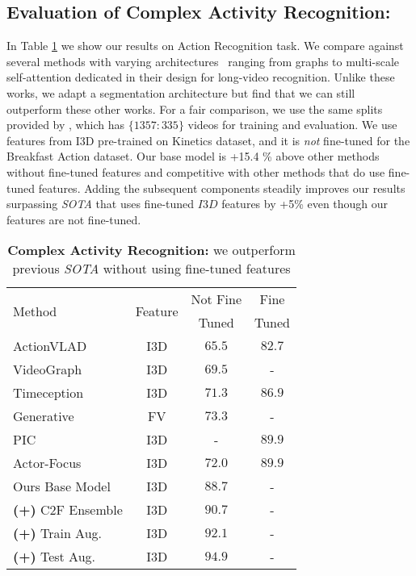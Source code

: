\documentclass[10pt,twocolumn,letterpaper]{article}
\begin{document}
\subsection{Evaluation of Complex Activity Recognition:} In Table \ref{tab:high-level-action-results} we show our results on Action Recognition task.  We compare against several methods with varying architectures~\cite{highlevel-girdhar2017actionvlad, highlevel-hussein2019videograph,highlevel-hussein2019timeception, highlevel-hussein2020pic} ranging from graphs to multi-scale self-attention dedicated in their design for long-video recognition. Unlike these works, we adapt a segmentation architecture but find that we can still outperform these other works. For a fair comparison, we use the same splits provided by \cite{highlevel-hussein2019videograph, highlevel-hussein2019timeception, highlevel-hussein2020pic}, which has $\{1357:335\}$ videos for training and evaluation. We use features from I3D pre-trained on Kinetics \cite{carreira2017quo} dataset, and it is \textit{not} fine-tuned for the Breakfast Action dataset. Our base model is +15.4 \% above other methods without fine-tuned features and competitive with other methods that do use fine-tuned features. Adding the subsequent components steadily improves our results surpassing \textit{SOTA} that uses fine-tuned $I3D$ features by +5\% even though our features are not fine-tuned.  


\begin{table}
\begin{center}
\small{
\begin{tabular}{l| c c c} 
\hline
\multirow{2}{*}{Method} & \multirow{2}{*}{Feature} & Not Fine & Fine\\
& &  Tuned & Tuned\\
\hline
\hline
ActionVLAD \cite{highlevel-girdhar2017actionvlad} & I3D & $65.5$ & $82.7$ \\
VideoGraph \cite{highlevel-hussein2019videograph} & I3D & $69.5$ & - \\
Timeception \cite{highlevel-hussein2019timeception} & I3D & $71.3$ & $86.9$ \\
Generative \cite{highlevel-kuehne2016end} & FV \cite{IDT-wang2013action} & $73.3$ & - \\
PIC \cite{highlevel-hussein2020pic} & I3D & - & $89.9$ \\
Actor-Focus \cite{highlevel-ballan2021long} & I3D & $72.0$ & $89.9$ \\
\hline
Ours Base Model & I3D & $88.7$ & -\\
\textbf{(+)} C2F Ensemble & I3D & $90.7$ & - \\
\textbf{(+)} Train Aug. & I3D & $92.1$ & - \\
\textbf{(+)} Test Aug. & I3D & $\mathbf{94.9}$ & - \\
\hline\hline
\end{tabular}
}
\end{center}
\caption{\textbf{Complex Activity Recognition:} we outperform previous \textit{SOTA} without using fine-tuned features}
\label{tab:high-level-action-results}
\end{table}
\end{document}

